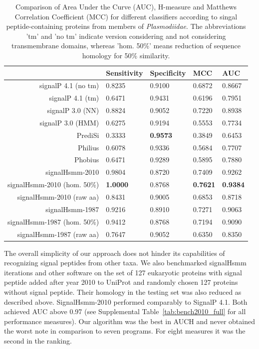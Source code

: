 \documentclass[10pt,letterpaper]{article}
\begin{document}
\begin{table}[ht]
\centering
\caption{Comparison of Area Under the Curve (AUC), H-measure and Matthews Correlation Coefficient (MCC) for different classifiers according to singal peptide-containing proteins from members of \textit{Plasmodiidae}. The abbreviations 'tm' and 'no tm' indicate version considering and not considering transmembrane domains, whereas 'hom. 50\%' means reduction of sequence homology for 50\% similarity.} 
\label{tab:bench2010plas}
\begin{tabular}{rllll}
  \toprule
 & Sensitivity & Specificity & MCC & AUC \\ 
  \midrule
signalP 4.1 (no tm) \cite{2011petersensignalp} & 0.8235 & 0.9100 & 0.6872 & 0.8667 \\ 
   \rowcolor[gray]{0.85}signalP 4.1 (tm) \cite{2011petersensignalp} & 0.6471 & 0.9431 & 0.6196 & 0.7951 \\ 
  signalP 3.0 (NN) \cite{2004bendtsenimproved} & 0.8824 & 0.9052 & 0.7220 & 0.8938 \\ 
   \rowcolor[gray]{0.85}signalP 3.0 (HMM) \cite{2004bendtsenimproved} & 0.6275 & 0.9194 & 0.5553 & 0.7734 \\ 
  PrediSi \cite{2004hillerpredisi} & 0.3333 & \textbf{0.9573} & 0.3849 & 0.6453 \\ 
   \rowcolor[gray]{0.85}Philius \cite{2008reynoldstransmembrane} & 0.6078 & 0.9336 & 0.5684 & 0.7707 \\ 
  Phobius \cite{2004klla} & 0.6471 & 0.9289 & 0.5895 & 0.7880 \\ 
   \rowcolor[gray]{0.85}signalHsmm-2010 & 0.9804 & 0.8720 & 0.7409 & 0.9262 \\ 
  signalHsmm-2010 (hom. 50\%) & \textbf{1.0000} & 0.8768 & \textbf{0.7621} & \textbf{0.9384} \\ 
   \rowcolor[gray]{0.85}signalHsmm-2010 (raw aa) & 0.8431 & 0.9005 & 0.6853 & 0.8718 \\ 
  signalHsmm-1987 & 0.9216 & 0.8910 & 0.7271 & 0.9063 \\ 
   \rowcolor[gray]{0.85}signalHsmm-1987 (hom. 50\%) & 0.9412 & 0.8768 & 0.7194 & 0.9090 \\ 
  signalHsmm-1987 (raw aa) & 0.7647 & 0.9052 & 0.6350 & 0.8350 \\ 
   \bottomrule
\end{tabular}
\end{table}

The overall simplicity of our approach does not hinder its capabilities of recognizing signal peptides from other taxa. We also benchmarked signalHsmm iterations and other software on the set of 127 eukaryotic proteins with signal peptide added after year 2010 to UniProt and randomly chosen 127 proteins without signal peptide. Their homology in the testing set was also reduced as described above. SignalHsmm-2010 performed comparably to SignalP 4.1. Both achieved AUC above 0.97 (see Supplemental Table~\ref{tab:bench2010_full} for all performance measures). Our algorithm was the best in AUCH and never obtained the worst note in comparison to seven programs. For eight measures it was the second in the ranking.
\end{document}
